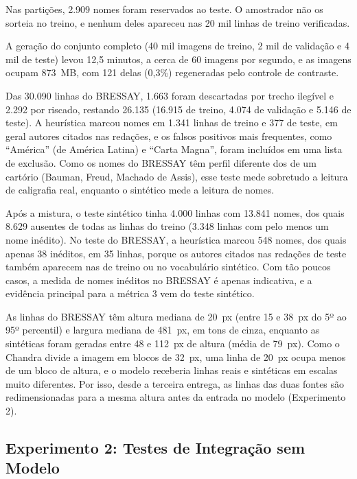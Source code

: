 \documentclass[12pt,a4paper]{article}
\begin{document}
Nas partições, 2.909 nomes foram reservados ao teste. O amostrador não os sorteia no treino, e nenhum deles apareceu nas 20 mil linhas de treino verificadas.

A geração do conjunto completo (40 mil imagens de treino, 2 mil de validação e 4 mil de teste) levou 12,5 minutos, a cerca de 60 imagens por segundo, e as imagens ocupam 873~MB, com 121 delas (0,3\%) regeneradas pelo controle de contraste.

Das 30.090 linhas do BRESSAY, 1.663 foram descartadas por trecho ilegível e 2.292 por riscado, restando 26.135 (16.915 de treino, 4.074 de validação e 5.146 de teste). A heurística marcou nomes em 1.341 linhas de treino e 377 de teste, em geral autores citados nas redações, e os falsos positivos mais frequentes, como ``América'' (de América Latina) e ``Carta Magna'', foram incluídos em uma lista de exclusão. Como os nomes do BRESSAY têm perfil diferente dos de um cartório (Bauman, Freud, Machado de Assis), esse teste mede sobretudo a leitura de caligrafia real, enquanto o sintético mede a leitura de nomes.

Após a mistura, o teste sintético tinha 4.000 linhas com 13.841 nomes, dos quais 8.629 ausentes de todas as linhas do treino (3.348 linhas com pelo menos um nome inédito). No teste do BRESSAY, a heurística marcou 548 nomes, dos quais apenas 38 inéditos, em 35 linhas, porque os autores citados nas redações de teste também aparecem nas de treino ou no vocabulário sintético. Com tão poucos casos, a medida de nomes inéditos no BRESSAY é apenas indicativa, e a evidência principal para a métrica 3 vem do teste sintético.

As linhas do BRESSAY têm altura mediana de 20~px (entre 15 e 38~px do 5º ao 95º percentil) e largura mediana de 481~px, em tons de cinza, enquanto as sintéticas foram geradas entre 48 e 112~px de altura (média de 79~px). Como o Chandra divide a imagem em blocos de 32~px, uma linha de 20~px ocupa menos de um bloco de altura, e o modelo receberia linhas reais e sintéticas em escalas muito diferentes. Por isso, desde a terceira entrega, as linhas das duas fontes são redimensionadas para a mesma altura antes da entrada no modelo (Experimento 2).

\subsection{Experimento 2: Testes de Integração sem Modelo}
\label{subsec:exp2}
\end{document}
